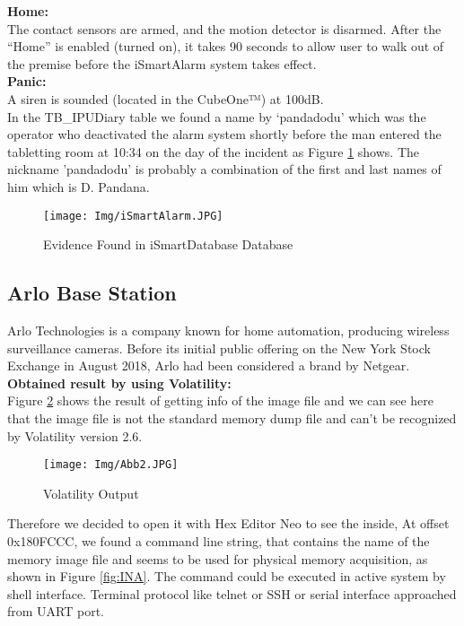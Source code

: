 \documentclass{easychair}
\begin{document}
\textbf{Home:} \\
The contact sensors are armed, and the motion detector is disarmed. After the “Home” is enabled (turned on), it takes 90 seconds to allow user to walk out of the premise before the iSmartAlarm system takes effect\cite{pari_9}.\\

\textbf{Panic:}\\
 A siren is sounded (located in the CubeOne™) at 100dB\cite{pari_9}.\\

In the TB\_IPUDiary table we found a name by ‘pandadodu’ which was the operator who deactivated the alarm system shortly before the man entered the tabletting room at 10:34 on the day of the incident as Figure \ref{fig:ISMD} shows. The nickname 'pandadodu' is probably a combination of the first and last names of him which is D. Pandana.
\begin{figure}[H]
    \centering
    \texttt{[image: Img/iSmartAlarm.JPG]}
    \caption{Evidence Found in iSmartDatabase Database}
    \label{fig:ISMD}
\end{figure}


\subsection{Arlo Base Station}

Arlo Technologies is a company known for home automation, producing wireless surveillance cameras. Before its initial public offering on the New York Stock Exchange in August 2018, Arlo had been considered a brand by Netgear.\\

\textbf{Obtained result by using Volatility:}\\
Figure \ref{fig:VD} shows the result of getting info of the image file and we can see here that the image file is not the standard memory dump file and can’t be recognized by Volatility version 2.6.
\begin{figure}[H]
    \centering
    \texttt{[image: Img/Abb2.JPG]}
    \caption{Volatility Output }
    \label{fig:VD}
\end{figure}

Therefore we decided to open it with Hex Editor Neo to see the inside, At offset 0x180FCCC, we found a command line string, that contains the name of the memory image file and seems to be used for physical memory acquisition, as shown in Figure \ref{fig:INA}.  The command could be executed in active system by shell interface. Terminal protocol like telnet or SSH or serial interface approached from UART port.
\end{document}
